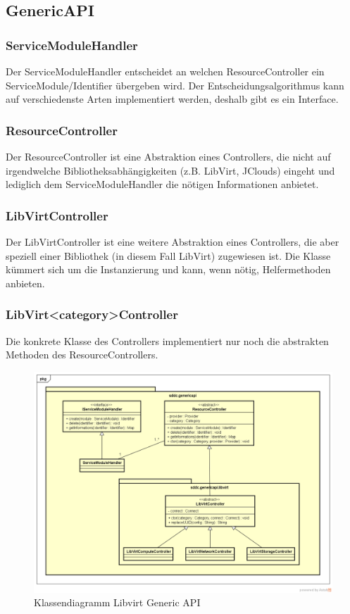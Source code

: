 \subsection{GenericAPI}
\subsubsection{ServiceModuleHandler}
Der ServiceModuleHandler entscheidet an welchen ResourceController ein ServiceModule/Identifier übergeben wird.
Der Entscheidungsalgorithmus kann auf verschiedenste Arten implementiert werden, deshalb gibt es ein Interface.

\subsubsection{ResourceController}
Der ResourceController ist eine Abstraktion eines Controllers, die nicht auf irgendwelche 
Bibliotheksabhängigkeiten (z.B. LibVirt, JClouds) eingeht und lediglich dem ServiceModuleHandler die nötigen Informationen anbietet.

\subsubsection{LibVirtController}
Der LibVirtController ist eine weitere Abstraktion eines Controllers, die aber speziell einer 
Bibliothek (in diesem Fall LibVirt) zugewiesen ist. Die Klasse kümmert sich um die 
Instanzierung und kann, wenn nötig, Helfermethoden anbieten.

\subsubsection{LibVirt<category>Controller}

Die konkrete Klasse des Controllers implementiert nur noch die abstrakten Methoden des ResourceControllers.

\begin{figure}[!htbp]
\includegraphics[width=\textwidth]{./05_Design/04_Architektur/genericapi}
\caption{Klassendiagramm Libvirt Generic API}
\end{figure}
\newpage  
